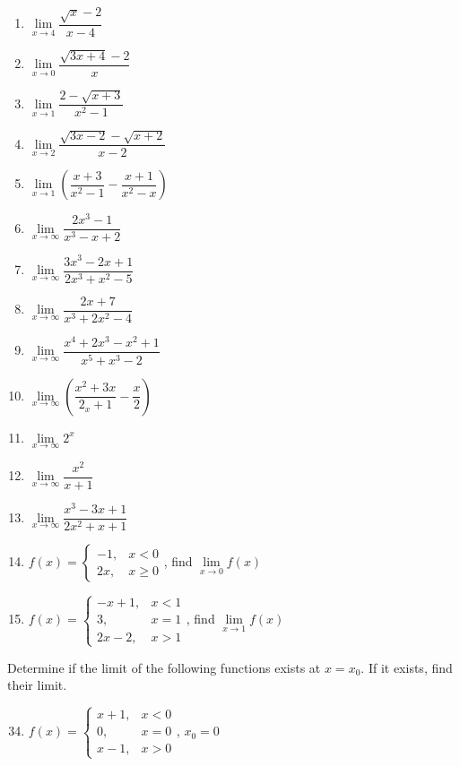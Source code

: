 \documentclass[12pt]{report}
\begin{document}
\begin{multicols}{2}
\begin{enumerate}
    \item $\lim\limits_{x\to4}{\dfrac{{\sqrt{x}}-2}{x-4}}$
    \item $\lim\limits_{x\to0}{\dfrac{\sqrt{3x+4}-2}{x}}$
    \item $\lim\limits_{x\to1}{\dfrac{2-{\sqrt{x+3}}}{x^{2}-1}}$
    \item $\lim\limits_{x\to2}{\dfrac{{\sqrt{3x-2}}-{\sqrt{x+2}}}{x-2}}$
    \item $\lim\limits_{x\to1}\left({\dfrac{x+3}{x^{2}-1}}-{\dfrac{x+1}{x^{2}-x}}\right)$
    \item $\lim\limits_{x\to\infty}{\dfrac{2x^{3}-1}{x^{3}-x+2}}$
    \item $\lim\limits_{x\to\infty}{\dfrac{3x^{3}-2x+1}{2x^{3}+x^{2}-5}}$
    \item $\lim\limits_{x\to\infty}{\dfrac{2x+7}{x^{3}+2x^{2}-4}}$
    \item $\lim\limits_{x\to\infty}{\dfrac{x^{4}+2x^{3}-x^{2}+1}{x^{5}+x^{3}-2}}$
    \item $\lim\limits_{x\to\infty}\left({\dfrac{x^{2}+3x}{2_x+1}}-{\dfrac{x}{2}}\right)$
    \item $\lim\limits_{x\to\infty}2^{x}$
    \item $\lim\limits_{x\to\infty}{\dfrac{x^{2}}{x+1}}$
    \item $\lim\limits_{x\to\infty}{\dfrac{x^{3}-3x+1}{2x^{2}+x+1}}$
    \item $f (x) = \left\{\begin{array}{rl}
              -1, & x < 0    \\
              2x, & x \geq 0
            \end{array}\right.$, find $\lim\limits_{x\to0}f (x)$
    \item $f (x) = \left\{\begin{array}{rl}
              -x+1,   & x < 1 \\
              3,      & x = 1 \\
              2x - 2, & x > 1
            \end{array}\right.$, find $\lim\limits_{x\to1}f (x)$
  \end{enumerate}
  Determine if the limit of the following functions exists at $x = x_0$. If it
  exists, find their limit.
  \begin{enumerate}
    \setcounter{enumi}{33}
    \item $f (x) = \left\{\begin{array}{rl}
              x+1, & x < 0 \\
              0,   & x = 0 \\
              x-1, & x > 0
            \end{array}\right.$, $x_0 = 0$


\end{enumerate}
\end{multicols}
\end{document}
